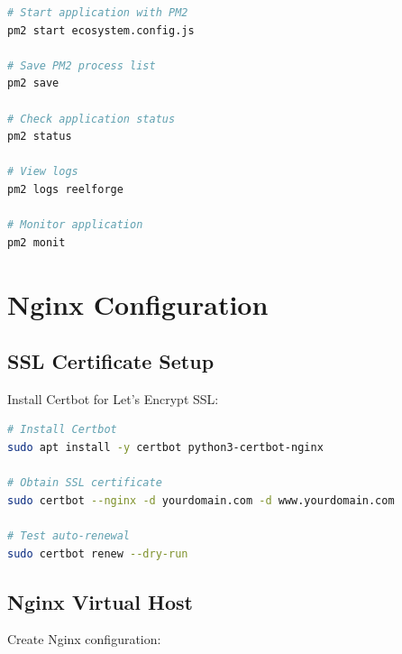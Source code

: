 \begin{lstlisting}[language=bash]
# Start application with PM2
pm2 start ecosystem.config.js

# Save PM2 process list
pm2 save

# Check application status
pm2 status

# View logs
pm2 logs reelforge

# Monitor application
pm2 monit
\end{lstlisting}

\section{Nginx Configuration}

\subsection{SSL Certificate Setup}

Install Certbot for Let's Encrypt SSL:

\begin{lstlisting}[language=bash]
# Install Certbot
sudo apt install -y certbot python3-certbot-nginx

# Obtain SSL certificate
sudo certbot --nginx -d yourdomain.com -d www.yourdomain.com

# Test auto-renewal
sudo certbot renew --dry-run
\end{lstlisting}

\subsection{Nginx Virtual Host}

Create Nginx configuration:


